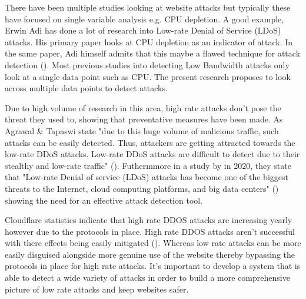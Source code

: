 
There have been multiple studies looking at website attacks but typically these have focused on single variable analysis e.g. CPU depletion. A good example, Erwin Adi has done a lot of research into Low-rate Denial of Service (LDoS) attacks. His primary paper looks at CPU depletion as an indicator of attack. In the same paper, Adi himself admits that this maybe a flawed technique for attack detection (\cite{Adi2016}). Most previous studies into detecting Low Bandwidth attacks only look at a single data point such as CPU. The present research proposes to look across multiple data points to detect attacks. 

Due to high volume of research in this area, high rate attacks don't pose the threat they used to, showing that preventative measures have been made. As Agrawal \& Tapaswi state "due to this huge volume of malicious traffic, such attacks can be easily detected. Thus, attackers are getting attracted towards the low-rate DDoS attacks. Low-rate DDoS attacks are difficult to detect due to their stealthy and low-rate traffic" (\cite{8794618}). Futhermmore in a study by \citeauthor{9016229} in 2020, they state that "Low-rate Denial of service (LDoS) attacks has become one of the biggest threats to the Internet, cloud computing platforms, and big data centers" (\cite{9016229}) showing the need for an effective attack detection tool.

Cloudflare statistics indicate that high rate DDOS attacks are increasing yearly however due to the protocols in place. High rate DDOS attacks aren't successful with there effects being easily mitigated (\cite{Q3attacks}). Whereas low rate attacks can be more easily disguised alongside more genuine use of the website thereby bypassing the protocols in place for high rate attacks. It's important to develop a system that is able to detect a wide variety of attacks in order to build a more comprehensive picture of low rate attacks and keep websites safer.

